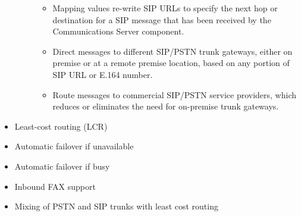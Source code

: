 \documentclass[letterpaper,10pt,english]{sphinxmanual}
\begin{document}
\begin{itemize}
\begin{description}
\begin{itemize}
\item {} 
Mapping values re-write SIP URLs to specify the next hop or destination for a SIP message that has been received by the Communications Server component.

\item {} 
Direct messages to different SIP/PSTN trunk gateways, either on premise or at a remote premise location, based on any portion of SIP URL or E.164 number.

\item {} 
Route messages to commercial SIP/PSTN service providers, which reduces or eliminates the need for on-premise trunk gateways.

\end{itemize}

\end{description}

\item {} 
Least-cost routing (LCR)

\item {} 
Automatic failover if unavailable

\item {} 
Automatic failover if busy

\item {} 
Inbound FAX support

\item {} 
Mixing of PSTN and SIP trunks with least cost routing

\end{itemize}
\end{document}
